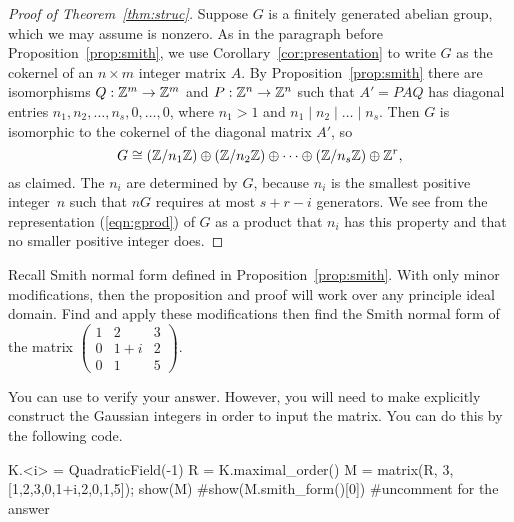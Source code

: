 \begin{proof}[Proof of Theorem~\ref{thm:struc}]
  Suppose $G$ is a finitely generated abelian group, which we may assume
  is nonzero.  As in the paragraph before Proposition~\ref{prop:smith},
  we use Corollary~\ref{cor:presentation} to write $G$ as the cokernel
  of an $n\times m$ integer matrix $A$.  By Proposition~\ref{prop:smith}
  there are isomorphisms $Q:\mathbb{Z}^m\to \mathbb{Z}^m$ and $P:\mathbb{Z}^n\to \mathbb{Z}^n$ such that
  $A'=PAQ$ has diagonal entries $n_1, n_2,\dots,
  n_s,0,\dots,0$, where $n_1>1$ and $n_1\mid n_2 \mid \dots \mid
  n_s$.  Then $G$ is isomorphic to the cokernel of the diagonal matrix
  $A'$, so
  \begin{equation}\label{eqn:gprod}
    G \cong (\mathbb{Z}/n_1\mathbb{Z}) \oplus (\mathbb{Z}/n_2\mathbb{Z})
    \oplus \cdots \oplus (\mathbb{Z}/n_s\mathbb{Z}) \oplus \mathbb{Z}^{r},
  \end{equation}
  as claimed.  The $n_i$ are determined by $G$, because $n_i$ is the
  smallest positive integer~$n$ such that $nG$ requires at most $s+r-i$
  generators. We see from the representation (\ref{eqn:gprod}) of $G$ as
  a product that $n_i$ has this property and that no smaller positive
  integer does.
\end{proof}

\begin{exercise}
  Recall Smith normal form defined in Proposition~\ref{prop:smith}. With only minor modifications, then the proposition and proof will work over any principle ideal domain. Find and apply these modifications then find the Smith normal form of the matrix $\begin{pmatrix} 1 & 2 & 3 \\ 0 & 1+i & 2 \\ 0 & 1 & 5 \end{pmatrix}$.

  \begin{hint}
    You can use {\Sage} to verify your answer. However, you will need to make explicitly construct the Gaussian integers in order to input the matrix. You can do this by the following code.
  \end{hint}
  \begin{sagecode}
  \begin{sagecell}
K.<i> = QuadraticField(-1)
R = K.maximal_order()
M = matrix(R, 3, [1,2,3,0,1+i,2,0,1,5]); show(M)
#show(M.smith_form()[0]) #uncomment for the answer
  \end{sagecell}
  \end{sagecode}
\end{exercise}


